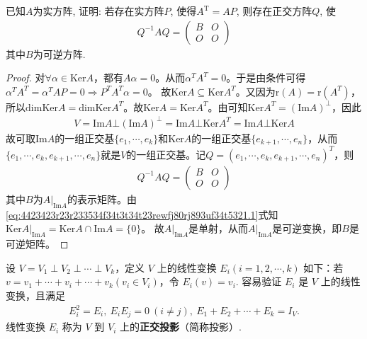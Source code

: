 \documentclass[../../main.tex]{subfiles}
\begin{document}
\begin{example}
已知$A$为实方阵, 证明: 若存在实方阵$P$, 使得$A^{\mathrm{T}} = AP$, 则存在正交方阵$Q$, 使\begin{align*}Q^{-1}AQ = \begin{pmatrix} B & O \\ O & O \end{pmatrix}\end{align*}其中$B$为可逆方阵.
\end{example}
\begin{proof}
对$\forall \alpha \in \mathrm{Ker}A$，都有$A\alpha =0$。从而$\alpha ^TA^T=0$。于是由条件可得
$\alpha ^TA^T=\alpha ^TAP=0\Longrightarrow P^TA^T\alpha =0$。
故$\mathrm{Ker}A\subseteq \mathrm{Ker}A^T$。又因为$\mathrm{r}(A) =\mathrm{r}(A^T)$，所以$\mathrm{dimKer}A=\mathrm{dimKer}A^T$。故$\mathrm{Ker}A=\mathrm{Ker}A^T$。由可知$\mathrm{Ker}A^T=\left( \mathrm{Im}A \right) ^{\bot}$，因此
\begin{align}\label{eq:4423423r23r233534f34t3t34t23rewfj80rj893uf34t5321.1}
V=\mathrm{Im}A\bot \left( \mathrm{Im}A \right) ^{\bot}=\mathrm{Im}A\bot \mathrm{Ker}A^T=\mathrm{Im}A\bot \mathrm{Ker}A
\end{align}
故可取$\mathrm{Im}A$的一组正交基$\{ e_1,\cdots ,e_k \}$和$\mathrm{Ker}A$的一组正交基$\{ e_{k+1},\cdots ,e_n \}$，从而
$\{ e_1,\cdots ,e_k,e_{k+1},\cdots ,e_n \}$就是$V$的一组正交基。记$Q=\left( e_1,\cdots ,e_k,e_{k+1},\cdots ,e_n \right) ^T$，则
\begin{align*}
Q^{-1}AQ=\begin{pmatrix}
B&		O\\
O&		O
\end{pmatrix}
\end{align*}
其中$B$为$A|_{\mathrm{Im}A}$的表示矩阵。由\eqref{eq:4423423r23r233534f34t3t34t23rewfj80rj893uf34t5321.1}式知
$\mathrm{Ker}A|_{\mathrm{Im}A}=\mathrm{Ker}A\cap \mathrm{Im}A=\{ 0 \}$。
故$A|_{\mathrm{Im}A}$是单射，从而$A|_{\mathrm{Im}A}$是可逆变换，即$B$是可逆矩阵。

\end{proof}

\begin{definition}[正交投影]
设 $V = V_1 \perp V_2 \perp \cdots \perp V_k$，定义 $V$ 上的线性变换 $E_i (i = 1, 2, \cdots, k)$ 如下：若 $v = v_1 + \cdots + v_i + \cdots + v_k (v_i \in V_i)$，令 $E_i(v) = v_i$. 容易验证 $E_i$ 是 $V$ 上的线性变换，且满足
\begin{align*}
E_i^2 = E_i, \ E_iE_j = 0\ (i \neq j), \ E_1 + E_2 + \cdots + E_k = I_V.
\end{align*}
线性变换 $E_i$ 称为 $V$ 到 $V_i$ 上的\textbf{正交投影}（简称投影）.
\end{definition}
\end{document}
